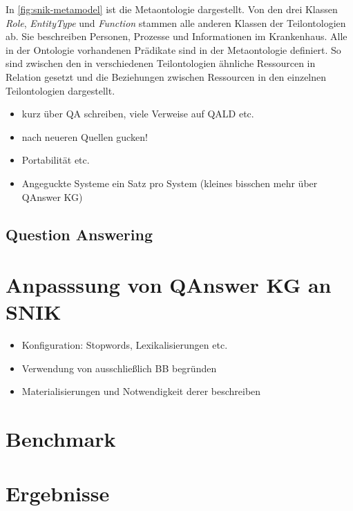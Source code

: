 \documentclass[utf8,biblatex]{lni}
\begin{document}
In \cref{fig:snik-metamodel} ist die Metaontologie dargestellt.
Von den drei Klassen \emph{Role}, \emph{EntityType} und \emph{Function} stammen alle anderen Klassen der Teilontologien ab.
Sie beschreiben Personen, Prozesse und Informationen im Krankenhaus.
Alle in der Ontologie vorhandenen Prädikate sind in der Metaontologie definiert.
So sind zwischen den in verschiedenen Teilontologien ähnliche Ressourcen in Relation gesetzt und die Beziehungen zwischen Ressourcen in den einzelnen Teilontologien dargestellt.

\begin{itemize}
  \item kurz über QA schreiben, viele Verweise auf QALD etc.
  \item nach neueren Quellen gucken!
  \item Portabilität etc. 
  \item Angeguckte Systeme ein Satz pro System (kleines bisschen mehr über QAnswer KG)
\end{itemize}

\subsection{Question Answering}

\section{Anpasssung von QAnswer KG an SNIK}
\begin{itemize}
  \item Konfiguration: Stopwords, Lexikalisierungen etc.
  \item Verwendung von ausschließlich BB begründen
  \item Materialisierungen und Notwendigkeit derer beschreiben
\end{itemize}

\section{Benchmark}

\section{Ergebnisse}
\end{document}
